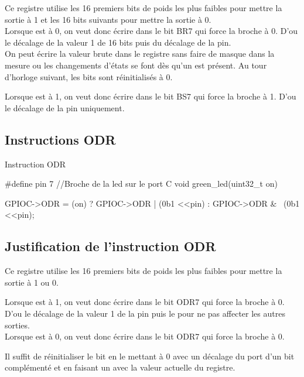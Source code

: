 Ce registre utilise les 16 premiers bits de poids les plus faibles pour mettre la sortie à 1 et les 16 bits suivants pour mettre la sortie à 0. \\

Lorsque  est à 0, on veut donc écrire dans le bit BR7 qui force la broche à 0. D'ou le décalage de la valeur 1 de 16 bits puis du décalage de la pin. \\
On peut écrire la valeur brute dans le registre sans faire de masque dans la mesure ou les changements d'états se font dès qu'un  est présent. Au tour d'horloge suivant, les bits sont réinitialisés à 0.

Lorsque  est à 1, on veut donc écrire dans le bit BS7 qui force la broche à 1. D'ou le décalage de la pin uniquement. \\



\subsection{Instructions ODR}

\begin{Cpp}{Instruction ODR}
  
  #define pin 7 //Broche de la led sur le port C
  void green_led(uint32_t on) {

    GPIOC->ODR = (on) ? GPIOC->ODR | (0b1 <<pin) : GPIOC->ODR & ~(0b1 <<pin);
     
  }
  

\end{Cpp}

\subsection{Justification de l'instruction ODR}

Ce registre utilise les 16 premiers bits de poids les plus faibles pour mettre la sortie à 1 ou 0.

Lorsque  est à 1, on veut donc écrire dans le bit ODR7 qui force la broche à 0. D'ou le décalage de la valeur 1 de la pin puis le  pour ne pas affecter les autres sorties. \\


Lorsque  est à 0, on veut donc écrire dans le bit ODR7 qui force la broche à 0. 

Il suffit de réinitialiser le bit en le mettant à 0 avec un décalage du port d'un bit complémenté et en faisant un 
avec la valeur actuelle du registre.

